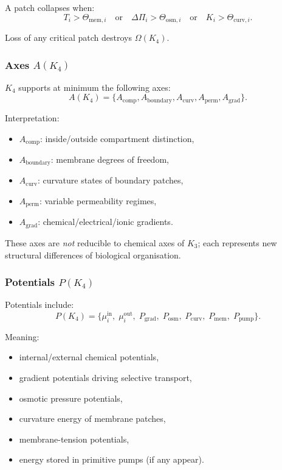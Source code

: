 A patch collapses when:
\[
T_i > \Theta_{\mathrm{mem},i}
\quad \text{or} \quad
\Delta \Pi_i > \Theta_{\mathrm{osm},i}
\quad \text{or} \quad
K_i > \Theta_{\mathrm{curv},i}.
\]

Loss of any critical patch destroys $\Omega(K_4)$.

\subsubsection{Axes \texorpdfstring{$A(K_4)$}{A(K_4)}}

$K_4$ supports at minimum the following axes:
\[
A(K_4) = \{ A_{\mathrm{comp}}, A_{\mathrm{boundary}},
           A_{\mathrm{curv}}, A_{\mathrm{perm}}, A_{\mathrm{grad}}\}.
\]

Interpretation:
\begin{itemize}
    \item $A_{\mathrm{comp}}$: inside/outside compartment distinction,
    \item $A_{\mathrm{boundary}}$: membrane degrees of freedom,
    \item $A_{\mathrm{curv}}$: curvature states of boundary patches,
    \item $A_{\mathrm{perm}}$: variable permeability regimes,
    \item $A_{\mathrm{grad}}$: chemical/electrical/ionic gradients.
\end{itemize}

These axes are \emph{not} reducible to chemical axes of $K_3$; each
represents new structural differences of biological organisation.

\subsubsection{Potentials \texorpdfstring{$P(K_4)$}{P(K_4)}}

Potentials include:
\[
P(K_4) =
\{ \mu_i^{\mathrm{in}},\; \mu_i^{\mathrm{out}},\;
   P_{\mathrm{grad}},\;
   P_{\mathrm{osm}},\;
   P_{\mathrm{curv}},\;
   P_{\mathrm{mem}},\;
   P_{\mathrm{pump}} \}.
\]

Meaning:
\begin{itemize}
    \item internal/external chemical potentials,
    \item gradient potentials driving selective transport,
    \item osmotic pressure potentials,
    \item curvature energy of membrane patches,
    \item membrane-tension potentials,
    \item energy stored in primitive pumps (if any appear).
\end{itemize}

